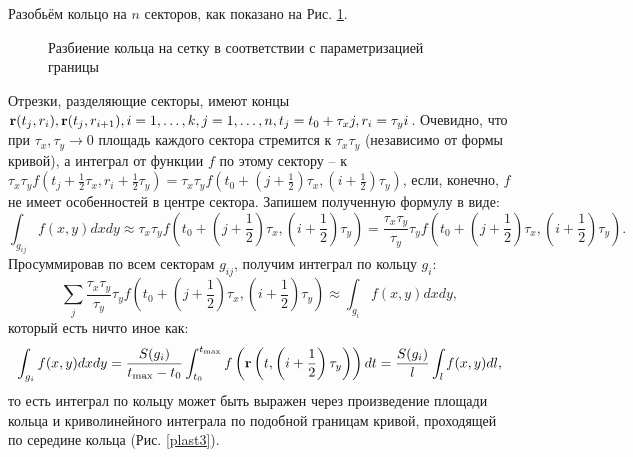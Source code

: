 \documentclass[a4paper, 12pt]{article}
\begin{document}
Разобьём кольцо на $n$ секторов, как показано на Рис. \ref{plast2}.
\begin{figure}[h!]
  \noindent{}
  \caption{Разбиение кольца на сетку в соответствии с параметризацией границы}
  \label{plast2}
  \end{figure} 
Отрезки, разделяющие секторы, имеют концы ${\bf r}(t_j,r_i), {\bf r}(t_j,r_{i+1}), i= 1, \dots, k, j=1,\dots,n, t_j=t_0+\tau_x j, r_i =\tau_y i$. Очевидно, что при $\tau_x, \tau_y \rightarrow 0$ площадь каждого сектора стремится к $\tau_x \tau_y$ (независимо от формы кривой), а интеграл от функции $f$ по этому сектору -- к $\tau_x \tau_y f(t_j+\frac{1}{2}\tau_x ,r_i + \frac{1}{2} \tau_y)=\tau_x \tau_y f(t_0+(j+\frac{1}{2})\tau_x ,(i+\frac{1}{2}) \tau_y)$, если, конечно, $f$ не имеет особенностей в центре сектора.
Запишем полученную формулу в виде:
$$\int_{g_{ij}}f(x,y)dx dy \approx \tau_x \tau_y f \left(t_0+\left(j+\frac{1}{2}\right)\tau_x ,\left(i+\frac{1}{2}\right) \tau_y\right)=\frac{\tau_x \tau_y}{\tau_y} \tau_y f \left(t_0+\left(j+\frac{1}{2}\right)\tau_x ,\left(i+\frac{1}{2}\right) \tau_y\right).$$
Просуммировав по всем секторам $g_{ij}$, получим интеграл по кольцу $g_{i}$:
$$\sum_j \frac{\tau_x \tau_y}{\tau_y} \tau_y f \left(t_0+\left(j+\frac{1}{2}\right)\tau_x ,\left(i+\frac{1}{2}\right) \tau_y\right) \approx \int_{g_i} f(x,y) dx dy,$$
который есть ничто иное как:
$$\int_{g_i} f(x,y)dx dy=\frac{S(g_i)}{t_{\max}-t_0} \int^{t_{\max}}_{t_0} f\left({\bf r}\left(t,\left(i+\frac{1}{2}\right)\tau_y\right)\right)dt=\frac{S(g_i)}{l} \int_l f(x,y) dl,$$
то есть интеграл по кольцу может быть выражен через произведение площади кольца и криволинейного интеграла по подобной границам кривой, проходящей по середине кольца (Рис. \ref{plast3}).
\end{document}
